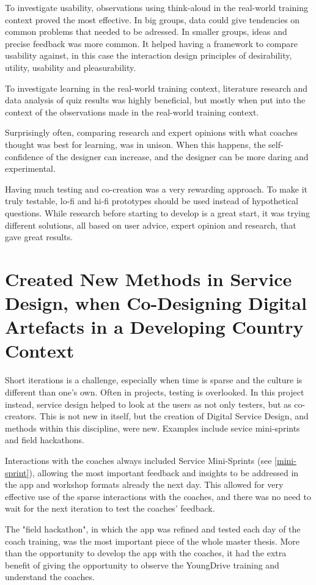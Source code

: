 To investigate usability, observations using think-aloud in the real-world training context proved the most effective. In big groups, data could give tendencies on common problems that needed to be adressed. In smaller groups, ideas and precise feedback was more common. It helped having a framework to compare usability against, in this case the interaction design principles of desirability, utility, usability and pleasurability.

To investigate learning in the real-world training context, literature research and data analysis of quiz results was highly beneficial, but mostly when put into the context of the observations made in the real-world training context.

Surprisingly often, comparing research and expert opinions with what coaches thought was best for learning, was in unison. When this happens, the self-confidence of the designer can increase, and the designer can be more daring and experimental.

Having much testing and co-creation was a very rewarding approach. To make it truly testable, lo-fi and hi-fi prototypes should be used instead of hypothetical questions. While research before starting to develop is a great start, it was trying different solutions, all based on user advice, expert opinion and research, that gave great results.

\section{Created New Methods in Service Design, when Co-Designing Digital Artefacts in a Developing Country Context}
Short iterations is a challenge, especially when time is sparse and the culture is different than one's own. Often in projects, testing is overlooked. In this project instead, service design helped to look at the users as not only testers, but as co-creators. This is not new in itself, but the creation of Digital Service Design, and methods within this discipline, were new. Examples include sevice mini-sprints and field hackathons.

Interactions with the coaches always included Service Mini-Sprints (see \ref{mini-sprint}), allowing the most important feedback and insights to be addressed in the app and workshop formats already the next day. This allowed for very effective use of the sparse interactions with the coaches, and there was no need to wait for the next iteration to test the coaches' feedback.

The "field hackathon", in which the app was refined and tested each day of the coach training, was the most important piece of the whole master thesis. More than the opportunity to develop the app with the coaches, it had the extra benefit of giving the opportunity to observe the YoungDrive training and understand the coaches.

